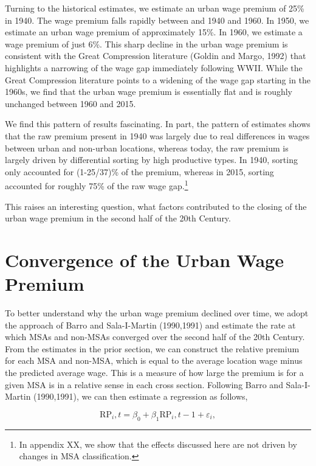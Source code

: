 \documentclass[12pt,twoside]{article}
\begin{document}
Turning to the historical estimates, we estimate an urban wage premium of 25\% in 1940. 
The wage premium falls rapidly between and 1940 and 1960.
In 1950, we estimate an urban wage premium of approximately 15\%.
In 1960, we estimate a wage premium of just 6\%. 
This sharp decline in the urban wage premium is consistent with the Great Compression literature (Goldin and Margo, 1992) that highlights a narrowing of the wage gap immediately following WWII. 
While the Great Compression literature points to a widening of the wage gap starting in the 1960s, we find that the urban wage premium is essentially flat and is roughly unchanged between 1960 and 2015. 


We find this pattern of results fascinating.
In part, the pattern of estimates shows that the raw premium present in 1940 was largely due to real differences in wages between urban and non-urban locations, whereas today, the raw premium is largely driven by differential sorting by high productive types.
In 1940, sorting only accounted for (1-25/37)\% of the premium, whereas in 2015, sorting accounted for roughly 75\% of the raw wage gap.\footnote{In appendix XX, we show that the effects discussed here are not driven by changes in MSA classification.}

This raises an interesting question, what factors contributed to the closing of the urban wage premium in the second half of the 20th Century.
 
\section{Convergence of the Urban Wage Premium}\label{sec:convergence1}
To better understand why the urban wage premium declined over time, we adopt the approach of Barro and Sala-I-Martin (1990,1991) and estimate the rate at which MSAs and non-MSAs converged over the second half of the 20th Century. 
From the estimates in the prior section, we can construct the relative premium for each MSA and non-MSA, which is equal to the average location wage minus the predicted average wage. 
This is a measure of how large the premium is for a given MSA is in a relative sense in each cross section.
Following Barro and Sala-I-Martin (1990,1991), we can then estimate a regression as follows,  

\begin{equation}
    \label{eq:converge_1}
    \text{RP}_i,t = \beta_0 + \beta_1 \text{RP}_i,t-1 + \varepsilon_i,
\end{equation}
\end{document}
